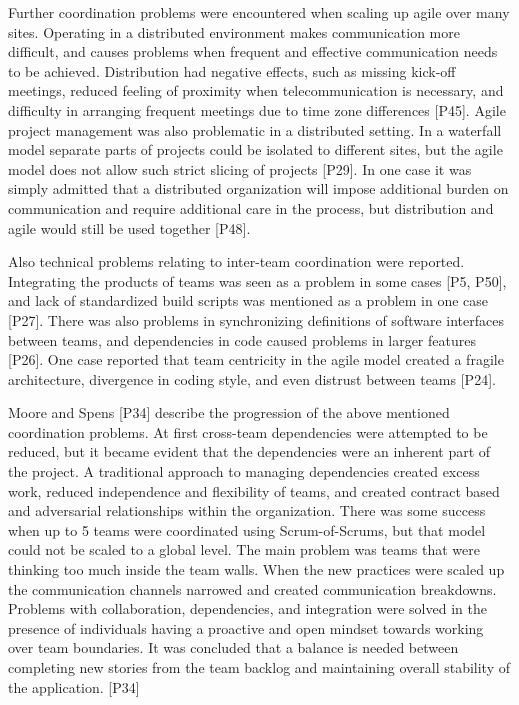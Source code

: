 Further coordination problems were encountered when scaling up agile over many
sites. Operating in a distributed environment makes communication more
difficult, and causes problems when frequent and effective communication needs
to be achieved. Distribution had negative effects, such as missing kick-off
meetings, reduced feeling of proximity when telecommunication is necessary, and
difficulty in arranging frequent meetings due to time zone differences [P45].
Agile project management was also problematic in a distributed setting. In a
waterfall model separate parts of projects could be isolated to different sites,
but the agile model does not allow such strict slicing of projects [P29]. In one
case it was simply admitted that a distributed organization will impose
additional burden on communication and require additional care in the process,
but distribution and agile would still be used together [P48].

Also technical problems relating to inter-team coordination were reported.
Integrating the products of teams was seen as a problem in some cases [P5, P50],
and lack of standardized build scripts was mentioned as a problem in one case
[P27]. There was also problems in synchronizing definitions of software
interfaces between teams, and dependencies in code caused problems in larger
features [P26]. One case reported that team centricity in the agile model
created a fragile architecture, divergence in coding style, and even distrust
between teams [P24].

Moore and Spens [P34] describe the progression of the above mentioned
coordination problems. At first cross-team dependencies were attempted to be
reduced, but it became evident that the dependencies were an inherent part of
the project. A traditional approach to managing dependencies created excess
work, reduced independence and flexibility of teams, and created contract based
and adversarial relationships within the organization. There was some success
when up to 5 teams were coordinated using Scrum-of-Scrums, but that model could
not be scaled to a global level. The main problem was teams that were thinking
too much inside the team walls. When the new practices were scaled up the
communication channels narrowed and created communication breakdowns. Problems
with collaboration, dependencies, and integration were solved in the presence of
individuals having a proactive and open mindset towards working over team
boundaries. It was concluded that a balance is needed between completing new
stories from the team backlog and maintaining overall stability of the
application. [P34]

